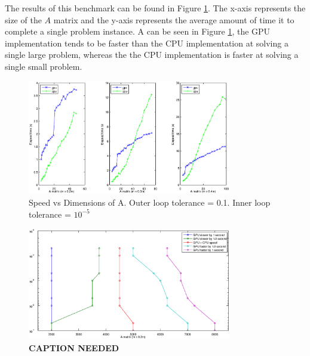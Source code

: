 \documentclass[10pt,twocolumn,letterpaper]{article}
\begin{document}
The results of this benchmark can be found in Figure \ref{fig:random_data}.
The x-axis represents the size of the $A$ matrix and the y-axis represents the
average amount of time it to complete a single problem instance.  A can be seen
in Figure \ref{fig:random_data}, the GPU implementation tends to be faster than
the CPU implementation at solving a single large problem, whereas the the CPU
implementation is faster at solving a single small problem.  
\begin{figure}
\begin{center}
\includegraphics[width=3.5in]{results/random_data/time_vs_matrix_size_constant_tol}
\end{center}
\caption{Speed vs Dimensions of A.  Outer loop tolerance = 0.1.  Inner loop tolerance = $10^{-5}$}
\label{fig:random_data}
\end{figure}

\begin{figure}
\begin{center}
\includegraphics[width=3.5in]{results/random_data/size_vs_speed_crossover_ratio_2}
\end{center}
\caption{\bf CAPTION NEEDED}
\label{fig:random_data2}
\end{figure}
\end{document}
